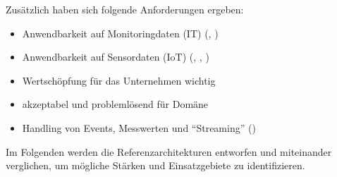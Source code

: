Zusätzlich haben sich folgende Anforderungen ergeben:
\begin{itemize}
\item Anwendbarkeit auf Monitoringdaten (IT) (, )
\item Anwendbarkeit auf Sensordaten (\ac{IoT}) (, , )
\item Wertschöpfung für das Unternehmen wichtig
\item akzeptabel und problemlösend für Domäne
\item Handling von Events, Messwerten und \enquote{Streaming} ()
\end{itemize}


Im Folgenden werden die Referenzarchitekturen entworfen und miteinander verglichen, um mögliche Stärken und Einsatzgebiete zu identifizieren.